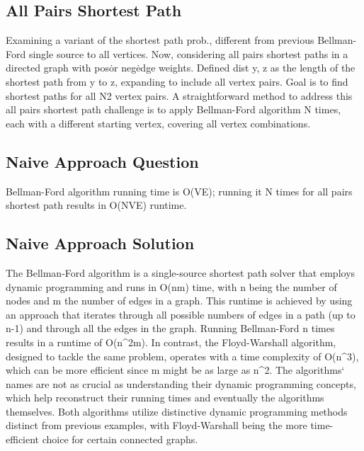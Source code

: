 \subsection*{All Pairs Shortest Path}
Examining a variant of the shortest path prob., different from previous Bellman-Ford single source to all vertices.
Now, considering all pairs shortest paths in a directed graph with pos\. or neg\. edge weights.
Defined dist y, z as the length of the shortest path from y to z, expanding to include all vertex pairs.
Goal is to find shortest paths for all N2 vertex pairs.
A straightforward method to address this all pairs shortest path challenge is to apply Bellman-Ford algorithm N times, each with a different starting vertex, covering all vertex combinations.

\subsection*{Naive Approach Question}
Bellman-Ford algorithm running time is O(VE); running it N times for all pairs shortest path results in O(NVE) runtime.

\subsection*{Naive Approach Solution}
The Bellman-Ford algorithm is a single-source shortest path solver that employs dynamic programming and runs in O(nm) time, with n being the number of nodes and m the number of edges in a graph.
This runtime is achieved by using an approach that iterates through all possible numbers of edges in a path (up to n-1) and through all the edges in the graph.
Running Bellman-Ford n times results in a runtime of O(n\textasciicircum{}2m).
In contrast, the Floyd-Warshall algorithm, designed to tackle the same problem, operates with a time complexity of O(n\textasciicircum{}3), which can be more efficient since m might be as large as n\textasciicircum{}2.
The algorithms` names are not as crucial as understanding their dynamic programming concepts, which help reconstruct their running times and eventually the algorithms themselves.
Both algorithms utilize distinctive dynamic programming methods distinct from previous examples, with Floyd-Warshall being the more time-efficient choice for certain connected graphs.

